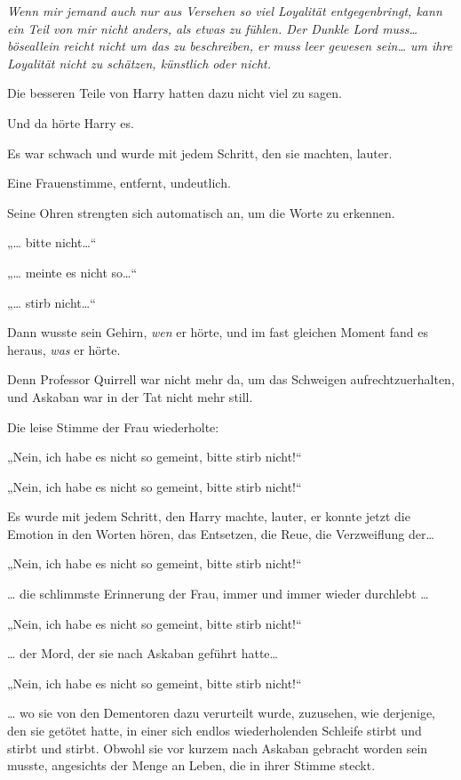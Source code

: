 {\emph{\emph{Wenn mir jemand auch nur aus Versehen so viel Loyalität entgegenbringt, kann ein Teil von mir nicht anders, als etwas zu fühlen. Der Dunkle Lord muss…} böse\emph{allein reicht nicht um das zu beschreiben, er muss leer gewesen sein… um ihre Loyalität nicht zu schätzen, künstlich oder nicht.}}

Die besseren Teile von Harry hatten dazu nicht viel zu sagen.

Und da hörte Harry es.

Es war schwach und wurde mit jedem Schritt, den sie machten, lauter.

Eine Frauenstimme, entfernt, undeutlich.

Seine Ohren strengten sich automatisch an, um die Worte zu erkennen.

„… bitte nicht…“

„… meinte es nicht so…“

„… stirb nicht…“

Dann wusste sein Gehirn, \emph{wen} er hörte, und im fast gleichen Moment fand es heraus, \emph{was} er hörte.

Denn Professor Quirrell war nicht mehr da, um das Schweigen aufrechtzuerhalten, und Askaban war in der Tat nicht mehr still.

Die leise Stimme der Frau wiederholte:

„Nein, ich habe es nicht so gemeint, bitte stirb nicht!“

„Nein, ich habe es nicht so gemeint, bitte stirb nicht!“

Es wurde mit jedem Schritt, den Harry machte, lauter, er konnte jetzt die Emotion in den Worten hören, das Entsetzen, die Reue, die Verzweiflung der…

„Nein, ich habe es nicht so gemeint, bitte stirb nicht!“

… die schlimmste Erinnerung der Frau, immer und immer wieder durchlebt …

„Nein, ich habe es nicht so gemeint, bitte stirb nicht!“

… der Mord, der sie nach Askaban geführt hatte…

„Nein, ich habe es nicht so gemeint, bitte stirb nicht!“

… wo sie von den Dementoren dazu verurteilt wurde, zuzusehen, wie derjenige, den sie getötet hatte, in einer sich endlos wiederholenden Schleife stirbt und stirbt und stirbt. Obwohl sie vor kurzem nach Askaban gebracht worden sein musste, angesichts der Menge an Leben, die in ihrer Stimme steckt.

}
